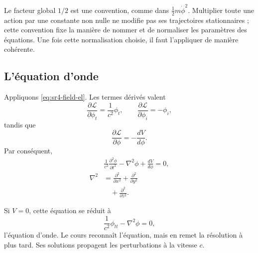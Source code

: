 Le facteur global \(1/2\) est une convention, comme dans \(\tfrac12m\dot\phi^2\). Multiplier toute une action par une constante non nulle ne modifie pas ses trajectoires stationnaires ; cette convention fixe la manière de nommer et de normaliser les paramètres des équations. Une fois cette normalisation choisie, il faut l’appliquer de manière cohérente.

\begin{classroomqa}
\end{classroomqa}

\subsection{L’équation d’onde}

Appliquons \eqref{eq:sr4-field-el}. Les termes dérivés valent
\begin{equation}
\frac{\partial\mathcal{L}}{\partial\phi_t}
=\frac{1}{c^2}\phi_t,
\qquad
\frac{\partial\mathcal{L}}{\partial\phi_i}
=-\phi_i,
\end{equation}
tandis que
\begin{equation}
\frac{\partial\mathcal{L}}{\partial\phi}
=-\frac{dV}{d\phi}.
\end{equation}
Par conséquent,
\begin{equation}
\begin{aligned}
&\boxed{
\frac{1}{c^2}\frac{\partial^2\phi}{\partial t^2}
-\nabla^2\phi
+\frac{dV}{d\phi}
=0
},\\[0.5em]
\nabla^2
&=
\frac{\partial^2}{\partial x^2}
+\frac{\partial^2}{\partial y^2}\\
&\quad
+\frac{\partial^2}{\partial z^2}.
\end{aligned}
\label{eq:sr4-general-scalar-eom}
\end{equation}

Si \(V=0\), cette équation se réduit à
\begin{equation}
\boxed{
\frac{1}{c^2}\phi_{tt}-\nabla^2\phi=0
},
\label{eq:sr4-wave-equation}
\end{equation}
l’équation d’onde. Le cours reconnaît l’équation, mais en remet la résolution à plus tard. Ses solutions propagent les perturbations à la vitesse \(c\).

